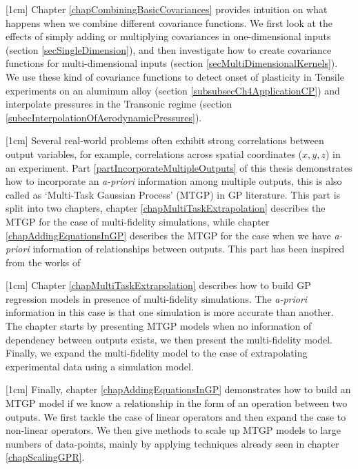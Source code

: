 [1cm]
Chapter \ref{chapCombiningBasicCovariances} provides intuition on what happens when we combine different covariance functions. We first look at the effects of simply adding or multiplying covariances in one-dimensional inputs (section \ref{secSingleDimension}), and then investigate how to create covariance functions for multi-dimensional inputs (section \ref{secMultiDimensionalKernels}). We use these kind of covariance functions to detect onset of plasticity in Tensile experiments on an aluminum alloy (section \ref{subsubsecCh4ApplicationCP}) and interpolate pressures in the Transonic regime (section \ref{subecInterpolationOfAerodynamicPressures}). 

[1cm]
Several real-world problems often exhibit strong correlations between output variables, for example, correlations across spatial coordinates ($x, y, z$) in an experiment. Part \ref{partIncorporateMultipleOutputs} of this thesis demonstrates how to incorporate an \textit{a-priori} information among multiple outputs, this is also called as `Multi-Task Gaussian Process' (MTGP) in GP literature. This part is split into two chapters, chapter \ref{chapMultiTaskExtrapolation} describes the MTGP for the case of multi-fidelity simulations, while chapter \ref{chapAddingEquationsInGP} describes the MTGP for the case when we have \textit{a-priori} information of relationships between outputs. This part has been inspired from the works of \cite{forrester2007multi, alvarez2011kernels, bonilla_multi-task_2008, Boyle05dependentgaussian, kennedy2000predicting, le2013multi, Constantinescu2013, journals/jmlr/AlvarezLL09, jidling2017linearly, ginsbourger2013invariances, sarkka2011linear}

[1cm]
Chapter \ref{chapMultiTaskExtrapolation} describes how to build GP regression models in presence of multi-fidelity simulations. The \textit{a-priori} information in this case is that one simulation is more accurate than another. The chapter starts by presenting MTGP models when no information of dependency between outputs exists, we then present the multi-fidelity model. Finally, we expand the multi-fidelity model to the case of extrapolating experimental data using a simulation model. 

[1cm]
Finally, chapter \ref{chapAddingEquationsInGP} demonstrates how to build an MTGP model if we know a relationship in the form of an operation between two outputs. We first tackle the case of linear operators and then expand the case to non-linear operators. We then give methods to scale up MTGP models to large numbers of data-points, mainly by applying techniques already seen in chapter \ref{chapScalingGPR}. 

